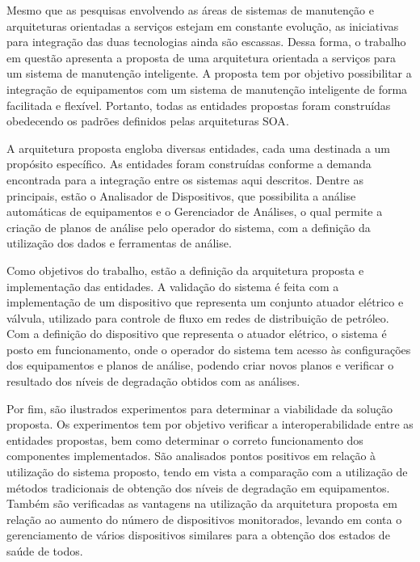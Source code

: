 
Mesmo que as pesquisas envolvendo as áreas de sistemas de manutenção e arquiteturas orientadas a
serviços estejam em constante evolução, as iniciativas para integração das duas tecnologias ainda
são escassas. Dessa forma, o trabalho em questão apresenta a proposta de uma arquitetura orientada a
serviços para um sistema de manutenção inteligente. A proposta tem por objetivo possibilitar a
integração de equipamentos com um sistema de manutenção inteligente de forma facilitada e flexível.
Portanto, todas as entidades propostas foram construídas obedecendo os padrões definidos pelas
arquiteturas \gls{SOA}.

A arquitetura proposta engloba diversas entidades, cada uma destinada a um propósito específico. As
entidades foram construídas conforme a demanda encontrada para a integração entre os sistemas aqui
descritos. Dentre as principais, estão o Analisador de Dispositivos, que possibilita a análise
automáticas de equipamentos e o Gerenciador de Análises, o qual permite a criação de planos de
análise pelo operador do sistema, com a definição da utilização dos dados e ferramentas de análise.



Como objetivos do trabalho, estão a definição da arquitetura proposta e implementação das entidades.
A validação do sistema é feita com a implementação de um dispositivo que representa um conjunto
atuador elétrico e válvula, utilizado para controle de fluxo em redes de distribuição de petróleo.
Com a definição do dispositivo que representa o atuador elétrico, o sistema é posto em
funcionamento, onde o operador do sistema tem acesso às configurações dos equipamentos e planos de
análise, podendo criar novos planos e verificar o resultado dos níveis de degradação obtidos com as
análises.

Por fim, são ilustrados experimentos para determinar a viabilidade da solução proposta. Os
experimentos tem por objetivo verificar a interoperabilidade entre as entidades propostas, bem como
determinar o correto funcionamento dos componentes implementados. São analisados pontos positivos em
relação à utilização do sistema proposto, tendo em vista a comparação com a utilização de métodos
tradicionais de obtenção dos níveis de degradação em equipamentos. Também são verificadas as
vantagens na utilização da arquitetura proposta em relação ao aumento do número de dispositivos
monitorados, levando em conta o gerenciamento de vários dispositivos similares para a obtenção dos
estados de saúde de todos.


